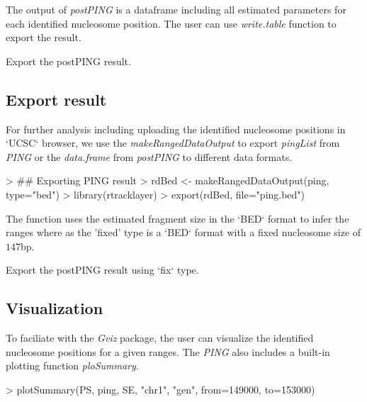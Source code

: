 \documentclass[12pt]{article}
\newcommand{\Rfunction}[1]{{\textit{#1}}}
\newcommand{\Rclass}[1]{{\textit{#1}}}
\begin{document}
The output of \Rfunction{postPING} is a dataframe including all estimated parameters for each identified nucleosome position. The user can use \Rfunction{write.table} function to export the result. 

\begin{Exercise}
Export the postPING result.
\end{Exercise}

\subsection{Export result}

For further analysis including uploading the identified nucleosome positions in `UCSC` browser, we use the \Rfunction{makeRangedDataOutput} to export \Rclass{pingList} from \Rfunction{PING} or the \Rclass{data.frame} from \Rfunction{postPING} to different data formats. 

\begin{Schunk}
\begin{Sinput}
> ## Exporting PING result 
> rdBed <- makeRangedDataOutput(ping, type="bed")
> library(rtracklayer)
> export(rdBed, file="ping.bed")
\end{Sinput}
\end{Schunk}

The function uses the estimated fragment size in the `BED` format to infer the ranges where as the 'fixed' type is a `BED` format with a fixed nucleosome size of $147$bp.  

\begin{Exercise}
Export the postPING result using `fix` type.
\end{Exercise}



\subsection{Visualization}

To faciliate with the \Rclass{Gviz} package, the user can visualize the identified nucleosome positions for a given ranges. The \Rclass{PING} also includes a built-in plotting function \Rfunction{ploSummary}. 

\begin{Schunk}
\begin{Sinput}
> plotSummary(PS, ping, SE, "chr1", "gen", from=149000, to=153000)
\end{Sinput}
\end{Schunk}
\end{document}
